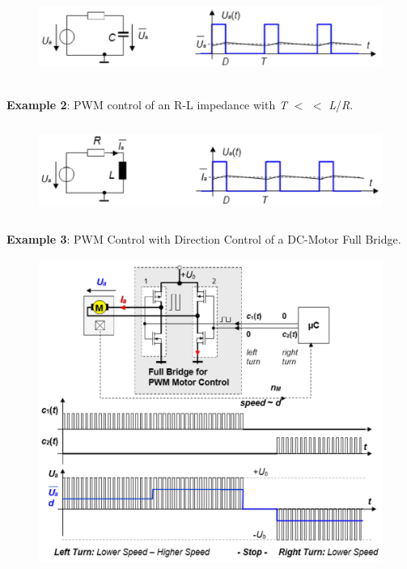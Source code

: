     \begin{figure}[h]
    \centering
    \includegraphics[width=12cm, height=3cm]{Images/image167.png}
    \label{fig:Fig 121}
    \end{figure}

\textbf{Example 2}:  PWM control of an R-L impedance with \textit{T} $\mathrm{<}$ $\mathrm{<}$ \textit{L}/\textit{R}.

    \begin{figure}[h]
    \centering
    \includegraphics[width=12cm, height=3cm]{Images/image168.png}
    \label{fig:Fig 122}
    \end{figure}

\textbf{Example 3}:  PWM Control with Direction Control of a DC-Motor  Full Bridge.

    \begin{figure}[h]
    \centering
    \includegraphics[width=15cm, height=10cm]{Images/image169.png}
    \label{fig:Fig 123}
    \end{figure}
\newpage

